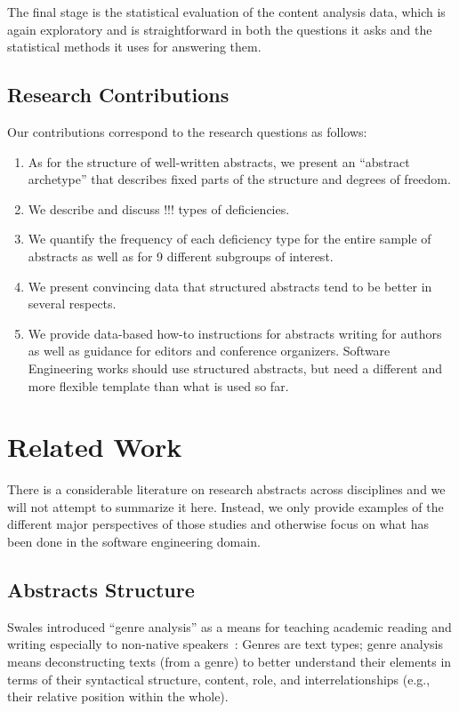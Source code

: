 \documentclass[10pt,journal,compsoc]{IEEEtran}
\begin{document}
The final stage is the statistical evaluation of the content analysis data,
which is again exploratory and is straightforward in both
the questions it asks and the statistical methods it uses for answering them.


\subsection{Research Contributions}

Our contributions correspond to the research questions as follows:
\begin{enumerate}
	\item As for the structure of well-written abstracts, we present an ``abstract archetype''
	  that describes fixed parts of the structure and degrees of freedom.
	\item We describe and discuss !!! types of deficiencies.
	\item We quantify the frequency of each deficiency type for the entire sample of abstracts
	  as well as for 9 different subgroups of interest.
	\item We present convincing data that structured abstracts tend to be better
	  in several respects.
	\item We provide data-based how-to instructions for abstracts writing for authors
	  as well as guidance for editors and conference organizers.
	  Software Engineering works should use structured abstracts, but
	  need a different and more flexible template than what is used so far.
\end{enumerate}


\section{Related Work}

There is a considerable literature on research abstracts across disciplines
and we will not attempt to summarize it here.
Instead, we only provide examples of the different major perspectives of those studies
and otherwise focus on what has been done in the software engineering domain.


\subsection{Abstracts Structure}

Swales introduced ``genre analysis'' as a means for teaching academic reading and writing
especially to non-native speakers~\cite{Swales90}:
Genres are text types;
genre analysis means deconstructing texts (from a genre) to better understand
their elements in
terms of their syntactical structure, content, role, and interrelationships
(e.g., their relative position within the whole).
\end{document}
